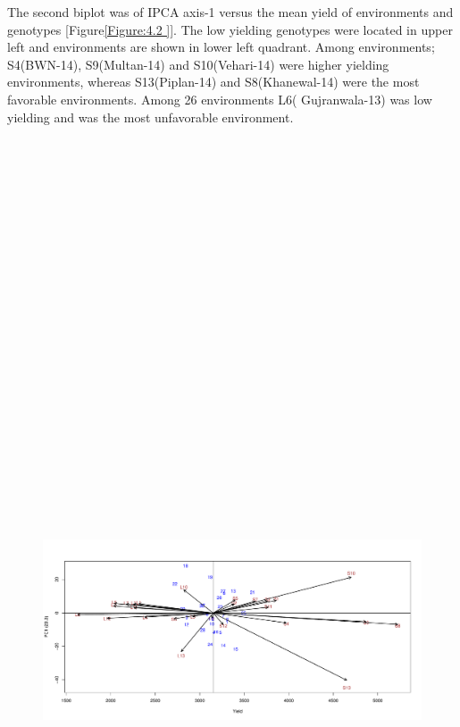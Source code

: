 \clearpage
The second biplot was of IPCA axis-1 versus the mean yield of environments and genotypes [Figure\ref{Figure:4.2 }]. The low yielding genotypes were located in upper left  and environments are shown in lower left quadrant. Among environments; S4(BWN-14), S9(Multan-14) and S10(Vehari-14) were higher yielding environments, whereas  S13(Piplan-14) and S8(Khanewal-14) were the most favorable environments. Among 26 environments L6( Gujranwala-13) was low yielding and was the most unfavorable environment. 
\begin{figure} [h!]
	\centering  
	\scalebox{0.4}
	{\includegraphics[width=15in,height=14in]{02ThesisMain/Ch04RD/figures/myplot}}

\end{figure}
